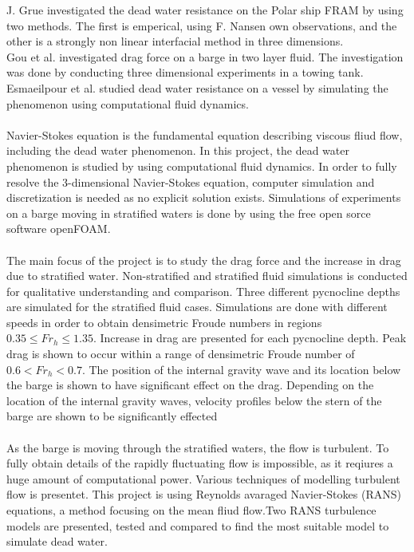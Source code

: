 \documentclass[a4paper, 12pt]{report}
\begin{document}
J. Grue investigated the dead water resistance on the Polar ship FRAM by using two methods. The first is emperical, using F. Nansen own observations, and the other is a strongly non linear interfacial method in three dimensions.\\
Gou et al. investigated drag force on a barge in two layer fluid. The investigation was done by conducting three dimensional experiments in a towing tank. \\
Esmaeilpour et al. studied dead water resistance on a vessel by simulating the phenomenon using computational fluid dynamics.\\
\\
Navier-Stokes equation is the fundamental equation describing viscous fliud flow, including the dead water phenomenon. In this project, the dead water phenomenon is studied by using computational fluid dynamics. In order to fully resolve the 3-dimensional Navier-Stokes equation, computer simulation and discretization is needed as no explicit solution exists. Simulations of experiments on a barge moving in stratified waters is done by using the free open sorce software openFOAM.\\
\\
The main focus of the project is to study the drag force and the increase in drag due to stratified water. Non-stratified and stratified fluid simulations is conducted for qualitative understanding and comparison. Three different pycnocline depths are simulated for the stratified fluid cases. Simulations are done with different speeds in order to obtain densimetric Froude numbers in regions $0.35 \leq Fr_h \leq 1.35$.  Increase in drag are presented for each pycnocline depth. Peak drag is shown to occur within a range of densimetric Froude number of $0.6 < Fr_h < 0.7$. The position of the internal gravity wave and its location below the barge is shown to have significant effect on the drag. Depending on the location of the internal gravity waves, velocity profiles below the stern of the barge are shown to be significantly effected \\
\\
As the barge is moving through the stratified waters, the flow is turbulent. To fully obtain details of the rapidly fluctuating flow is impossible, as it reqiures a huge amount of computational power. Various techniques of modelling turbulent flow is presentet. This project is using Reynolds avaraged Navier-Stokes (RANS) equations, a method focusing on the mean fliud flow.Two RANS turbulence models are presented, tested and compared to find the most suitable model to simulate dead water.\\
\end{document}
